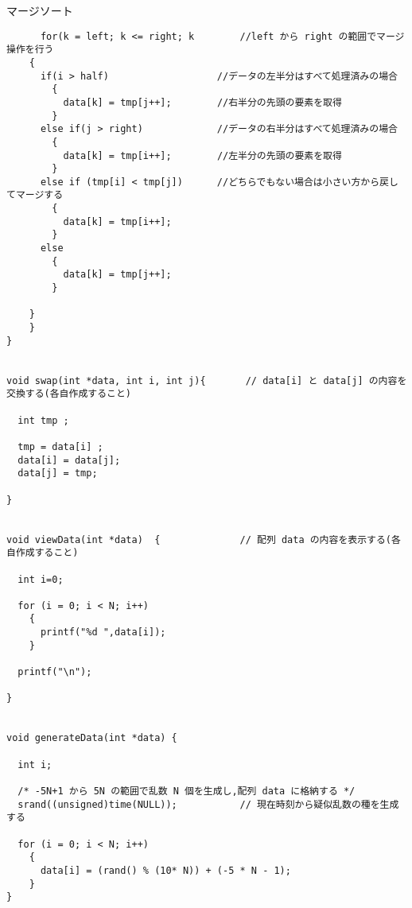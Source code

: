 \documentclass[a4j,titlepage]{jarticle}
\begin{document}
\begin{breakitembox}[l]{マージソート}
\begin{verbatim}
      for(k = left; k <= right; k        //left から right の範囲でマージ操作を行う
	{
	  if(i > half)                   //データの左半分はすべて処理済みの場合
	    {
	      data[k] = tmp[j++];        //右半分の先頭の要素を取得
	    }
	  else if(j > right)             //データの右半分はすべて処理済みの場合
	    {
	      data[k] = tmp[i++];        //左半分の先頭の要素を取得
	    }
	  else if (tmp[i] < tmp[j])      //どちらでもない場合は小さい方から戻してマージする
	    {
	      data[k] = tmp[i++];
	    }
	  else
	    {
	      data[k] = tmp[j++];
	    }
	  
	}
    }    
}


void swap(int *data, int i, int j){       // data[i] と data[j] の内容を交換する(各自作成すること)

  int tmp ;

  tmp = data[i] ;
  data[i] = data[j];
  data[j] = tmp;
    
}


void viewData(int *data)  {              // 配列 data の内容を表示する(各自作成すること)
  
  int i=0;
  
  for (i = 0; i < N; i++)
    {
      printf("%d ",data[i]);
    }
  
  printf("\n");

}


void generateData(int *data) {

  int i; 
  
  /* -5N+1 から 5N の範囲で乱数 N 個を生成し,配列 data に格納する */
  srand((unsigned)time(NULL));           // 現在時刻から疑似乱数の種を生成する
  
  for (i = 0; i < N; i++)
    {
      data[i] = (rand() % (10* N)) + (-5 * N - 1);
    }
}

\end{verbatim}
\end{breakitembox}
\end{document}
